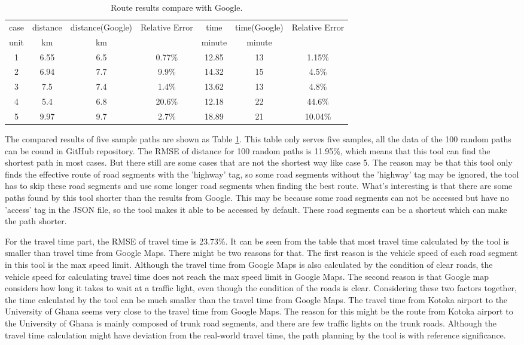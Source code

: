 \documentclass[final-report]{report-template}
\begin{document}
\begin{table}[H]
    \centering
    \begin{tabular}{|c|c|c|c|c|c|c|}
    \hline
   case & distance & distance(Google) & Relative Error & time & time(Google) & Relative Error\\
   unit & km & km &  & minute & minute &   \\
    \hline
    1 & 6.55 & 6.5 & 0.77\% & 12.85 & 13 & 1.15\% \\
    2 & 6.94 & 7.7 & 9.9\% & 14.32 & 15 & 4.5\% \\
    3 & 7.5 & 7.4 & 1.4\% & 13.62 & 13 & 4.8\% \\
    4 & 5.4 & 6.8 & 20.6\% & 12.18 & 22 & 44.6\% \\
    5 & 9.97 & 9.7 & 2.7\% & 18.89 & 21 & 10.04\% \\
    \hline
    \end{tabular}
    \caption{\label{tab:route_results}Route results compare with Google.}
\end{table}
The compared results of five sample paths are shown as Table \ref{tab:route_results}. 
This table only serves five samples, all the data of the 100 random paths can be cound in GitHub repository. 
The RMSE of distance for 100 random paths is 11.95\%, which means that this tool can find the shortest path in most cases.
But there still are some cases that are not the shortest way like case 5.
The reason may be that this tool only finds the effective route of road segments with the 'highway' tag,
so some road segments without the 'highway' tag may be ignored,
the tool has to skip these road segments and use some longer road segments when finding the best route.
What's interesting is that there are some paths found by this tool shorter than the results from Google.
This may be because some road segments can not be accessed but have no 'access' tag in the JSON file, 
so the tool makes it able to be accessed by default. These road segments can be a shortcut which can make the path shorter.

For the travel time part,
the RMSE of travel time is 23.73\%. 
It can be seen from the table that most travel time calculated by the tool is smaller than travel time from Google Maps.
There might be two reasons for that. 
The first reason is the vehicle speed of each road segment in this tool is the max speed limit. 
Although the travel time from Google Maps is also calculated by the condition of clear roads, 
the vehicle speed for calculating travel time does not reach the max speed limit in Google Maps.
The second reason is that Google map considers how long it takes to wait at a traffic light, 
even though the condition of the roads is clear.
Considering these two factors together, the time calculated by the tool can be much smaller than the travel time from Google Maps.
The travel time from Kotoka airport to the University of Ghana seems very close to the travel time from Google Maps. 
The reason for this might be the route from Kotoka airport to the University of Ghana is mainly composed of trunk road segments,
and there are few traffic lights on the trunk roads.
Although the travel time calculation might have deviation from the real-world travel time, 
the path planning by the tool is with reference significance.
\end{document}
